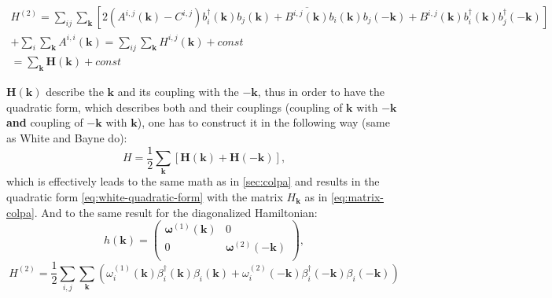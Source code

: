 \documentclass[a4paper,12pt]{article}
\begin{document}
            \begin{multline}
                H^{(2)} = \sum_{ij}\sum_{\boldsymbol{k}}\left[2(A^{i,j}(\boldsymbol{k}) - C^{i,j})b^{\dag}_{i}(\boldsymbol{k})b_{j}(\boldsymbol{k}) + 
                \overline{B^{i,j}(\boldsymbol{k})}b_{i}(\boldsymbol{k})b_{j}(-\boldsymbol{k}) +
                B^{i,j}(\boldsymbol{k})b^{\dag}_{i}(\boldsymbol{k})b^{\dag}_{j}(-\boldsymbol{k})\right]\\
                +\sum_i \sum_{\boldsymbol{k}} A^{i,i}(\boldsymbol{k}) 
                = \sum_{ij}\sum_{\boldsymbol{k}} H^{i,j}(\boldsymbol{k}) 
                + const \\ 
                = \sum_{\boldsymbol{k}} \boldsymbol{H}(\boldsymbol{k}) 
                + const
            \end{multline}

            $\boldsymbol{H}(\boldsymbol{k})$ describe the $\boldsymbol{k}$ and its coupling with the $-\boldsymbol{k}$, 
            thus in order to have the quadratic form, which describes both and their couplings 
            (coupling of $\boldsymbol{k}$ with $-\boldsymbol{k}$ \textbf{and} coupling of $-\boldsymbol{k}$ with $\boldsymbol{k}$), 
            one has to construct it in the following way (same as White and Bayne do):
            \begin{equation}
                H = \dfrac{1}{2}\sum_{\boldsymbol{k}} \left[\boldsymbol{H}(\boldsymbol{k}) + \boldsymbol{H}(-\boldsymbol{k})\right],
            \end{equation}
            which is effectively leads to the same math as in \ref{sec:colpa} and results in the quadratic form \eqref{eq:white-quadratic-form} 
            with the matrix $H_{\boldsymbol{k}}$ as in \eqref{eq:matrix-colpa}. And to the same result for the diagonalized Hamiltonian:
            \begin{equation}
                h(\boldsymbol{k}) = 
                \begin{pmatrix}
                    \boldsymbol{\omega}^{(1)}(\boldsymbol{k}) & 0 \\
                    0 & \boldsymbol{\omega}^{(2)}(-\boldsymbol{k}) \\
                \end{pmatrix}, 
            \end{equation}
            \begin{equation}
                H^{(2)} = \dfrac{1}{2}\sum_{i,j}\sum_{\boldsymbol{k}}\left(\omega_i^{(1)}(\boldsymbol{k})\beta^{\dag}_i(\boldsymbol{k})\beta_i(\boldsymbol{k}) + 
                \omega_i^{(2)}(-\boldsymbol{k})\beta^{\dag}_i(-\boldsymbol{k})\beta_i(-\boldsymbol{k})\right)
            \end{equation}
\end{document}
